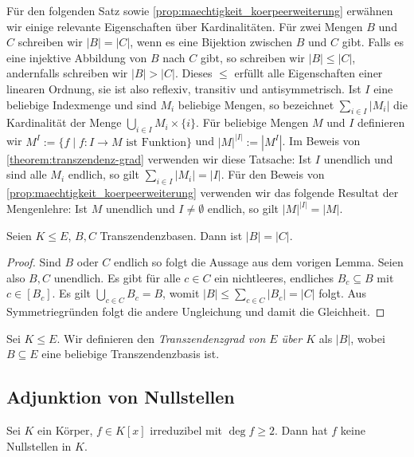Für den folgenden Satz sowie \cref{prop:maechtigkeit_koerpeerweiterung} erwähnen wir einige relevante Eigenschaften über Kardinalitäten. Für zwei Mengen $B$ und $C$ schreiben wir $|B|=|C|$, wenn es eine Bijektion zwischen $B$ und $C$ gibt. Falls es eine injektive Abbildung von $B$ nach $C$ gibt, so schreiben wir $|B|\le|C|$, andernfalls schreiben wir $|B|>|C|$. Dieses \glqq$\leq$\grqq{} erfüllt alle Eigenschaften einer linearen Ordnung, sie ist also reflexiv, transitiv und antisymmetrisch. Ist $I$ eine beliebige Indexmenge und sind $M_i$ beliebige Mengen, so bezeichnet $\sum_{i\in I}|M_i|$ die Kardinalität der Menge $\bigcup_{i\in I}M_i\times \{i\}$. Für beliebige Mengen $M$ und $I$ definieren wir $M^I:=\{f\mid f:I\to M\text{ ist Funktion}\}$ und $|M|^{|I|}:=|M^I|$. Im Beweis von \cref{theorem:transzendenz-grad} verwenden wir diese Tatsache: Ist $I$ unendlich und sind alle $M_i$ endlich, so gilt $\sum_{i\in I}|M_i|=|I|$. Für den Beweis von \cref{prop:maechtigkeit_koerpeerweiterung} verwenden wir das folgende Resultat der Mengenlehre: Ist $M$ unendlich und $I\neq\emptyset$ endlich, so gilt $|M|^{|I|}=|M|$.

\begin{theorem} \label{theorem:transzendenz-grad}
    Seien $K \leq E$, $B, C$ Transzendenzbasen. Dann ist $\vert B \vert = \vert C \vert$.
\end{theorem}

\begin{proof}
    Sind $B$ oder $C$ endlich so folgt die Aussage aus dem vorigen Lemma. Seien also $B,C$ unendlich. Es gibt für alle $c \in C$ ein nichtleeres, endliches $B_c \subseteq B$ mit $c \in [B_c]$. Es gilt $\bigcup_{c \in C} B_c = B$, womit $\vert B \vert \leq \sum_{c \in C} \vert B_c \vert = \vert C \vert$ folgt. Aus Symmetriegründen folgt die andere Ungleichung und damit die Gleichheit.
\end{proof}

\begin{definition}
    Sei $K \leq E$. Wir definieren den \emph{Transzendenzgrad von $E$ über $K$} als $\vert B \vert$, wobei $B \subseteq E$ eine beliebige Transzendenzbasis ist.
\end{definition}

\subsection{Adjunktion von Nullstellen}

\begin{lemma}
    Sei $K$ ein Körper, $f \in K[x]$ irreduzibel mit $\deg f \geq 2$. Dann hat $f$ keine Nullstellen in $K$.
\end{lemma}

